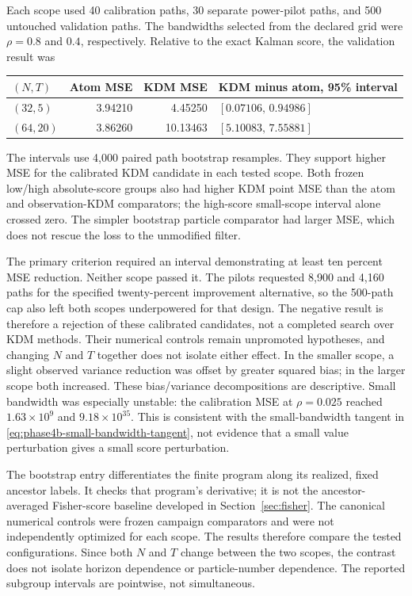 \documentclass[11pt]{article}
\begin{document}
Each scope used 40 calibration paths, 30 separate power-pilot paths, and 500
untouched validation paths.  The bandwidths selected from the declared grid
were $\rho=0.8$ and $0.4$, respectively.  Relative to the exact Kalman score,
the validation result was
\begin{center}
\begin{tabular}{lrrl}
\toprule
$(N,T)$ & Atom MSE & KDM MSE & KDM minus atom, 95\% interval\\
\midrule
$(32,5)$ & 3.94210 & 4.45250 & $[0.07106,\,0.94986]$\\
$(64,20)$ & 3.86260 & 10.13463 & $[5.10083,\,7.55881]$\\
\bottomrule
\end{tabular}
\end{center}
The intervals use 4,000 paired path bootstrap resamples.  They support higher
MSE for the calibrated KDM candidate in each tested scope.  Both frozen
low/high absolute-score groups also had higher KDM point MSE than the atom
and observation-KDM comparators; the high-score small-scope interval alone
crossed zero.  The simpler bootstrap particle comparator had larger MSE,
which does not rescue the loss to the unmodified filter.

The primary criterion required an interval demonstrating at least ten percent
MSE reduction.  Neither scope passed it.  The pilots requested 8,900 and
4,160 paths for the specified twenty-percent improvement alternative, so the
500-path cap also left both scopes underpowered for that design.  The
negative result is therefore a rejection of these calibrated candidates,
not a completed search over KDM methods.  Their numerical controls remain
unpromoted hypotheses, and changing $N$ and $T$ together does not isolate
either effect.  In the smaller scope, a slight observed variance reduction
was offset by greater squared bias; in the larger scope both increased.
These bias/variance decompositions are descriptive.  Small bandwidth was
especially unstable: the calibration MSE at $\rho=0.025$ reached
$1.63\times10^9$ and $9.18\times10^{35}$.  This is consistent with the
small-bandwidth tangent in \eqref{eq:phase4b-small-bandwidth-tangent}, not
evidence that a small value perturbation gives a small score perturbation.


The bootstrap entry differentiates the finite program along its realized,
fixed ancestor labels. It checks that program's derivative; it is not the
ancestor-averaged Fisher-score baseline developed in Section~\ref{sec:fisher}.
The canonical numerical controls were frozen campaign comparators and were
not independently optimized for each scope. The results therefore compare
the tested configurations. Since both $N$ and $T$ change between the two
scopes, the contrast does not isolate horizon dependence or particle-number
dependence. The reported subgroup intervals are pointwise, not simultaneous.
\end{document}
